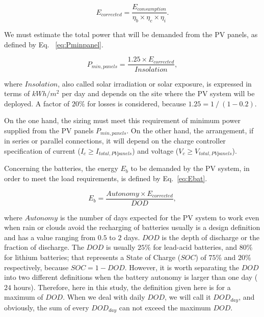 \documentclass[journal]{IEEEtran}
\begin{document}
\begin{equation}
\label{eq:Ecorrected}
E_{corrected} = \dfrac{E_{consumption}}{\eta_{b} \times \eta_{c} \times \eta_{i} }.
\end{equation}

We must estimate the total power that will be demanded from the PV panels, as defined by Eq. ~\eqref{eq:Pminpanel}.

\begin{equation}
\label{eq:Pminpanel}
P_{min,panels} = \dfrac{1.25 \times E_{corrected}}{Insolation},
\end{equation}

\noindent where $Insolation$, also called solar irradiation or solar exposure, is expressed in terms of $kWh/m^{2}$ per day and depends on the site where the PV system will be deployed. A factor of $20$\% for losses is considered, because $1.25 = 1 \mathbin{/} (1 - 0.2)$.

On the one hand, the sizing must meet this requirement of minimum power supplied from the PV panels $P_{min,panels}$. On the other hand, the arrangement, if in series or parallel connections, it will depend on the charge controller specification of current ($I_{c} \geq I_{total,PVpanels}$) and voltage ($V_{c} \geq V_{total,PVpanels}$).

Concerning the batteries, the energy $E_{b}$ to be demanded by the PV system, in order to meet the load requirements, is defined by Eq.~\eqref{eq:Ebat}.

\begin{equation}
\label{eq:Ebat}
E_{b} = \dfrac{Autonomy \times E_{corrected}}{DOD},
\end{equation}

\noindent where $Autonomy$ is the number of days expected for the PV system to work even when rain or clouds avoid the recharging of batteries usually is a design definition and has a value ranging from $0.5$ to $2$ days. $DOD$ is the depth of discharge or the fraction of discharge. The $DOD$ is usually $25$\% for lead-acid batteries, and $80$\% for lithium batteries; that represents a State of Charge ($SOC$) of $75$\% and $20$\% respectively, because $SOC=1-DOD$. However, it is worth separating the $DOD$ into two different definitions when the battery autonomy is larger than one day ($24$ hours). Therefore, here in this study, the definition given here is for a maximum of $DOD$. When we deal with daily $DOD$, we will call it $DOD_{day}$, and obviously, the sum of every $DOD_{day}$ can not exceed the maximum $DOD$.
\end{document}
